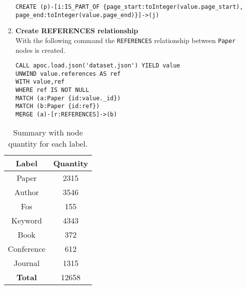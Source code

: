 \begin{enumerate}
\begin{lstlisting}[label={lst:lstlisting6}]
CREATE (p)-[i:IS_PART_OF {page_start:toInteger(value.page_start), page_end:toInteger(value.page_end)}]->(j)
    \end{lstlisting}
    \item \textbf{Create REFERENCES relationship}\\
    With the following command the \verb|REFERENCES| relationship between \verb|Paper| nodes is created.
    \begin{lstlisting}[label={lst:lstlisting7}]
CALL apoc.load.json('dataset.json') YIELD value
UNWIND value.references AS ref
WITH value,ref
WHERE ref IS NOT NULL
MATCH (a:Paper {id:value._id})
MATCH (b:Paper {id:ref})
MERGE (a)-[r:REFERENCES]->(b)
    \end{lstlisting}
\end{enumerate}
\begin{table}[H]
    \begin{center}
        \begin{tabular}{|c|c|}
            \hline \textbf{Label} & \textbf{Quantity}  \T\B \\
            \hline \hline
            Paper                 & 2315\T\B              \\
            Author                & 3546\T\B              \\
            Fos                   & 155\T\B               \\
            Keyword               & 4343\T\B              \\
            Book                  & 372\T\B               \\
            Conference            & 612\T\B               \\
            Journal               & 1315\T\B              \\
            \hline \hline
            \textbf{Total}        & 12658\T\B             \\
            \hline
        \end{tabular}
        \caption{Summary with node quantity for each label.}
        \label{tab:table2}
    \end{center}
\end{table}


